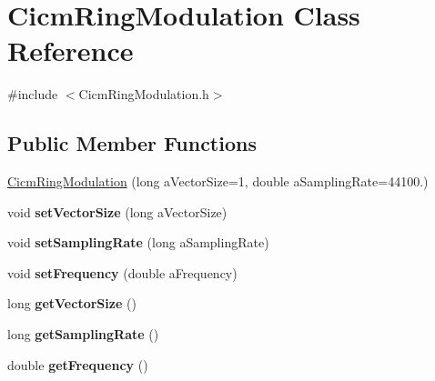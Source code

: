 \hypertarget{class_cicm_ring_modulation}{\section{Cicm\-Ring\-Modulation Class Reference}
\label{class_cicm_ring_modulation}
}


{\ttfamily \#include $<$Cicm\-Ring\-Modulation.\-h$>$}

\subsection*{Public Member Functions}
\begin{DoxyCompactItemize}
\item 
\hyperlink{class_cicm_ring_modulation_a421451721b34a88a1df6e2e072556527}{Cicm\-Ring\-Modulation} (long a\-Vector\-Size=1, double a\-Sampling\-Rate=44100.)
\item 
\hypertarget{class_cicm_ring_modulation_a15390c47bc280fd0283e77d1cfc1b8cc}{void {\bfseries set\-Vector\-Size} (long a\-Vector\-Size)}\label{class_cicm_ring_modulation_a15390c47bc280fd0283e77d1cfc1b8cc}

\item 
\hypertarget{class_cicm_ring_modulation_ad4a4f349aebabf28e7b34679252c4dac}{void {\bfseries set\-Sampling\-Rate} (long a\-Sampling\-Rate)}\label{class_cicm_ring_modulation_ad4a4f349aebabf28e7b34679252c4dac}

\item 
\hypertarget{class_cicm_ring_modulation_ad90a8da25392efc63d7afd338acf41c9}{void {\bfseries set\-Frequency} (double a\-Frequency)}\label{class_cicm_ring_modulation_ad90a8da25392efc63d7afd338acf41c9}

\item 
\hypertarget{class_cicm_ring_modulation_a44bbcbf21be8c1988f1d75613f8a0467}{long {\bfseries get\-Vector\-Size} ()}\label{class_cicm_ring_modulation_a44bbcbf21be8c1988f1d75613f8a0467}

\item 
\hypertarget{class_cicm_ring_modulation_a2087da92c5111c19dd3f0959582e4b26}{long {\bfseries get\-Sampling\-Rate} ()}\label{class_cicm_ring_modulation_a2087da92c5111c19dd3f0959582e4b26}

\item 
\hypertarget{class_cicm_ring_modulation_a38eea5039c3402b3f140b71544cbdf60}{double {\bfseries get\-Frequency} ()}\label{class_cicm_ring_modulation_a38eea5039c3402b3f140b71544cbdf60}


\end{DoxyCompactItemize}
